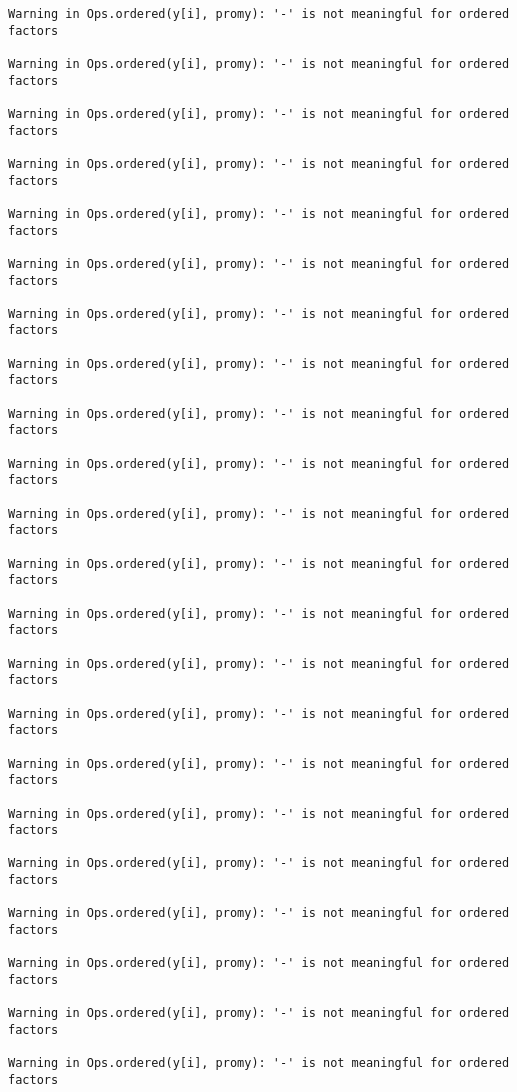 \documentclass[]{article}
\begin{document}
\begin{verbatim}
Warning in Ops.ordered(y[i], promy): '-' is not meaningful for ordered
factors

Warning in Ops.ordered(y[i], promy): '-' is not meaningful for ordered
factors

Warning in Ops.ordered(y[i], promy): '-' is not meaningful for ordered
factors

Warning in Ops.ordered(y[i], promy): '-' is not meaningful for ordered
factors

Warning in Ops.ordered(y[i], promy): '-' is not meaningful for ordered
factors

Warning in Ops.ordered(y[i], promy): '-' is not meaningful for ordered
factors

Warning in Ops.ordered(y[i], promy): '-' is not meaningful for ordered
factors

Warning in Ops.ordered(y[i], promy): '-' is not meaningful for ordered
factors

Warning in Ops.ordered(y[i], promy): '-' is not meaningful for ordered
factors

Warning in Ops.ordered(y[i], promy): '-' is not meaningful for ordered
factors

Warning in Ops.ordered(y[i], promy): '-' is not meaningful for ordered
factors

Warning in Ops.ordered(y[i], promy): '-' is not meaningful for ordered
factors

Warning in Ops.ordered(y[i], promy): '-' is not meaningful for ordered
factors

Warning in Ops.ordered(y[i], promy): '-' is not meaningful for ordered
factors

Warning in Ops.ordered(y[i], promy): '-' is not meaningful for ordered
factors

Warning in Ops.ordered(y[i], promy): '-' is not meaningful for ordered
factors

Warning in Ops.ordered(y[i], promy): '-' is not meaningful for ordered
factors

Warning in Ops.ordered(y[i], promy): '-' is not meaningful for ordered
factors

Warning in Ops.ordered(y[i], promy): '-' is not meaningful for ordered
factors

Warning in Ops.ordered(y[i], promy): '-' is not meaningful for ordered
factors

Warning in Ops.ordered(y[i], promy): '-' is not meaningful for ordered
factors

Warning in Ops.ordered(y[i], promy): '-' is not meaningful for ordered
factors
\end{verbatim}
\end{document}
